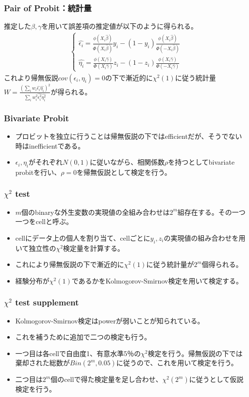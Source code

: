 \documentclass[dvipdfmx, 12pt]{beamer}
\begin{document}
\begin{frame}\frametitle{Pair of Probit：統計量}
推定した$\beta, \gamma$を用いて誤差項の推定値が以下のように得られる。
\begin{align*}
\begin{cases}
	\hat{\epsilon_i} = \frac{\phi(X_i \hat{\beta})}{\Phi(X_i \hat{\beta})} y_i - (1 - y_i) \frac{\phi(X_i \hat{\beta})}{\Phi(-X_i \hat{\beta})}\\[8pt]
	\hat{\eta_i} = \frac{\phi(X_i \hat{\gamma})}{\Phi(X_i \hat{\gamma})} z_i - (1 - z_i) \frac{\phi(X_i \hat{\gamma})}{\Phi(-X_i \hat{\gamma})}
\end{cases}
\end{align*}
これより帰無仮説$cov(\epsilon_i, \eta_i) = 0$の下で漸近的に$\chi^2(1)$に従う統計量$W = \frac{\left( \sum_{i} w_i \hat{\epsilon_i} \hat{\eta_i} \right)^2}{\sum_{i} w_i^2\hat{\epsilon_i^2}\hat{\eta_i^2}}$が得られる。
\end{frame}

\begin{frame}\frametitle{Bivariate Probit}
	\begin{itemize}
	\item プロビットを独立に行うことは帰無仮説の下ではefficientだが、そうでない時はinefficientである。
	\item $\epsilon_i, \eta_i$がそれぞれ$N(0,1)$に従いながら、相関係数$\rho$を持つとしてbivariate probitを行い、$\rho = 0$を帰無仮説として検定を行う。
	\end{itemize}
\end{frame}

\begin{frame}\frametitle{$\chi^2$ test}
	\begin{itemize}
	\item $m$個のbinaryな外生変数の実現値の全組み合わせは$2^m$組存在する。その一つ一つをcellと呼ぶ。
	\item cellにデータ上の個人を割り当て、cellごとに$y_i, z_i$の実現値の組み合わせを用いて独立性の$\chi^2$検定量を計算する。
	\item これにより帰無仮説の下で漸近的に$\chi^2(1)$に従う統計量が$2^m$個得られる。
	\item 経験分布が$\chi^2(1)$であるかをKolmogorov-Smirnov検定を用いて検定する。
	\end{itemize}
\end{frame}

\begin{frame}\frametitle{$\chi^2$ test supplement}
	\begin{itemize}
	\item Kolmogorov-Smirnov検定はpowerが弱いことが知られている。
	\item これを補うために追加で二つの検定も行う。
	\item 一つ目は各cellで自由度1、有意水準5％の$\chi^2$検定を行う。帰無仮説の下では棄却された総数が$Bin(2^m, 0.05)$に従うので、これを用いて検定を行う。
	\item 二つ目は$2^m$個のcellで得た検定量を足し合わせ、$\chi^2(2^m)$に従うとして仮説検定を行う。
	\end{itemize}
\end{frame}
\end{document}
